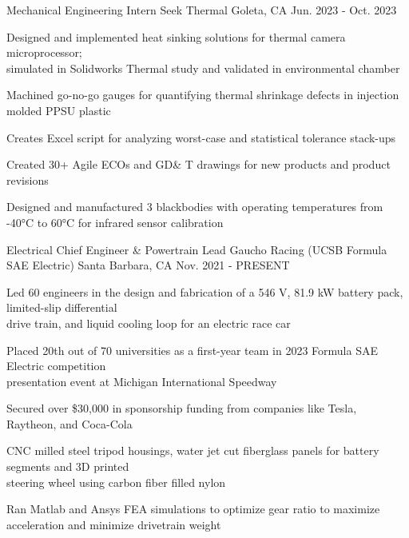 

\begin{cventries}

\cventry
{Mechanical Engineering Intern} %
{Seek Thermal} %
{Goleta, CA} %
{Jun. 2023 - Oct. 2023} %
{ %
\begin{cvitems}
\item{Designed and implemented heat sinking solutions for thermal camera microprocessor; \\ simulated in Solidworks Thermal study and validated in environmental chamber}
\item{Machined go-no-go gauges for quantifying thermal shrinkage defects in injection molded PPSU plastic}
\item{Creates Excel script for analyzing worst-case and statistical tolerance stack-ups}
\item{Created 30+ Agile ECOs and GD\& T drawings for new products and product revisions}
\item{Designed and manufactured 3 blackbodies with operating temperatures from -40°C to 60°C for infrared sensor calibration}
\end{cvitems}
}

\cventry
{Electrical Chief Engineer \& Powertrain Lead} %
{Gaucho Racing (UCSB Formula SAE Electric)} %
{Santa Barbara, CA} %
{Nov. 2021 - PRESENT} %
{ %
\begin{cvitems}   
\item {Led 60 engineers in the design and fabrication of a 546 V, 81.9 kW battery pack, limited-slip differential \\ drive train, and liquid cooling loop for an electric race car}
\item {Placed 20th out of 70 universities as a first-year team in 2023 Formula SAE Electric competition\\ presentation event at Michigan International Speedway}
\item {Secured over \$30,000 in sponsorship funding from companies like Tesla, Raytheon, and Coca-Cola}
\item {CNC milled steel tripod housings, water jet cut fiberglass panels for battery segments and 3D printed \\ steering wheel using carbon fiber filled nylon}
\item {Ran Matlab and Ansys FEA simulations to optimize gear ratio to maximize acceleration and minimize drivetrain weight}
\end{cvitems}
}



\end{cventries}
